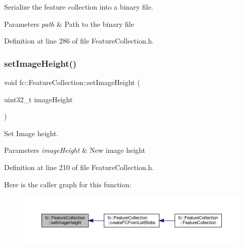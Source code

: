 Serialize the feature collection into a binary file. 


\begin{DoxyParams}{Parameters}
{\em path} & Path to the binary file \\
\hline
\end{DoxyParams}


Definition at line 286 of file Feature\+Collection.\+h.

\mbox{\label{classfc_1_1FeatureCollection_af187e8c3a7002a0f90a970c8c2166843}} 
\subsubsection{\texorpdfstring{set\+Image\+Height()}{setImageHeight()}}
{\footnotesize\ttfamily void fc\+::\+Feature\+Collection\+::set\+Image\+Height (\begin{DoxyParamCaption}\item[{uint32\+\_\+t}]{image\+Height }\end{DoxyParamCaption})\hspace{0.3cm}{\ttfamily [inline]}}



Set Image height. 


\begin{DoxyParams}{Parameters}
{\em image\+Height} & New image height \\
\hline
\end{DoxyParams}


Definition at line 210 of file Feature\+Collection.\+h.

Here is the caller graph for this function\+:
\nopagebreak
\begin{figure}[H]
\begin{center}
\leavevmode
\includegraphics[width=350pt]{d9/d78/classfc_1_1FeatureCollection_af187e8c3a7002a0f90a970c8c2166843_icgraph}
\end{center}
\end{figure}
\mbox{\label{classfc_1_1FeatureCollection_a8442b318f388e4cd5dea8bbfc429c711}} 
